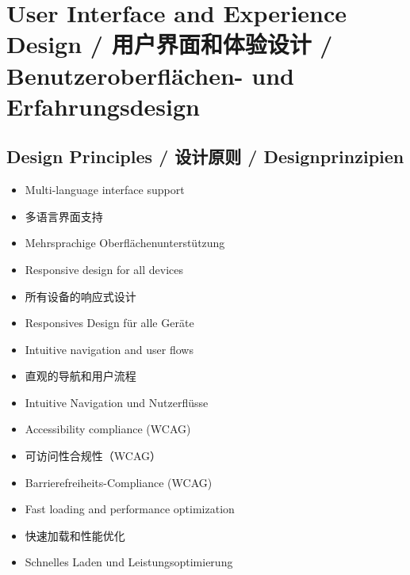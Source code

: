 \section{User Interface and Experience Design / 用户界面和体验设计 / Benutzeroberflächen- und Erfahrungsdesign}

\subsection{Design Principles / 设计原则 / Designprinzipien}
\begin{itemize}
    \item Multi-language interface support
    \item 多语言界面支持
    \item Mehrsprachige Oberflächenunterstützung
    \item Responsive design for all devices
    \item 所有设备的响应式设计
    \item Responsives Design für alle Geräte
    \item Intuitive navigation and user flows
    \item 直观的导航和用户流程
    \item Intuitive Navigation und Nutzerflüsse
    \item Accessibility compliance (WCAG)
    \item 可访问性合规性（WCAG）
    \item Barrierefreiheits-Compliance (WCAG)
    \item Fast loading and performance optimization
    \item 快速加载和性能优化
    \item Schnelles Laden und Leistungsoptimierung
\end{itemize}

